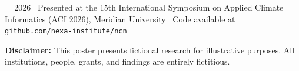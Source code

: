 \documentclass{article}
\begin{document}
\vspace{8pt}
\begin{center}
{\footnotesize\color{darktext!60} \faCreativeCommons\,\faCreativeCommonsBy\ \ 2026 \textbullet\ Presented at the 15th International Symposium on Applied Climate Informatics (ACI 2026), Meridian University \textbullet\ Code available at \texttt{github.com/nexa-institute/ncn}}

\vspace{2pt}
{\tiny\color{darktext!40} \textbf{Disclaimer:} This poster presents fictional research for illustrative purposes. All institutions, people, grants, and findings are entirely fictitious.}
\end{center}
\end{document}
